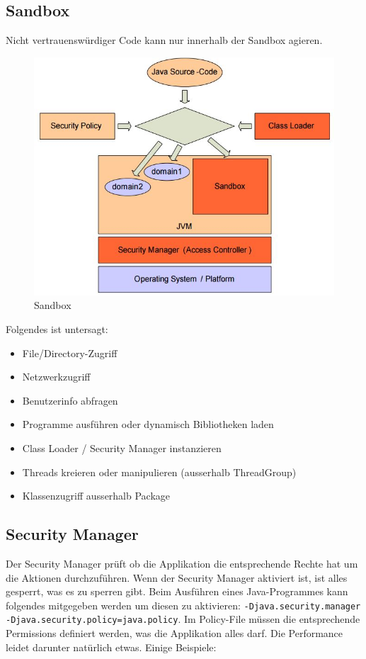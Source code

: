 \subsection{Sandbox}
Nicht vertrauenswürdiger Code kann nur innerhalb der Sandbox agieren.
\begin{figure}[h!]
\centering
\includegraphics[width=0.7\linewidth]{fig/java-sandbox}
\caption{Sandbox}
\label{fig:java-sandbox}
\end{figure}

Folgendes ist untersagt:
\begin{itemize}
	\item File/Directory-Zugriff
	\item Netzwerkzugriff
	\item Benutzerinfo abfragen
	\item Programme ausführen oder dynamisch Bibliotheken laden
	\item Class Loader / Security Manager instanzieren
	\item Threads kreieren oder manipulieren (ausserhalb ThreadGroup)
	\item Klassenzugriff ausserhalb Package 
\end{itemize}

\subsection{Security Manager}
Der Security Manager prüft ob die Applikation die entsprechende Rechte hat um die Aktionen durchzuführen. Wenn der Security Manager aktiviert ist, ist alles gesperrt, was es zu sperren gibt. Beim Ausführen eines Java-Programmes kann folgendes mitgegeben werden um diesen zu aktivieren: \verb|-Djava.security.manager -Djava.security.policy=java.policy|. Im Policy-File müssen die entsprechende Permissions definiert werden, was die Applikation alles darf. Die Performance leidet darunter natürlich etwas. Einige Beispiele:

